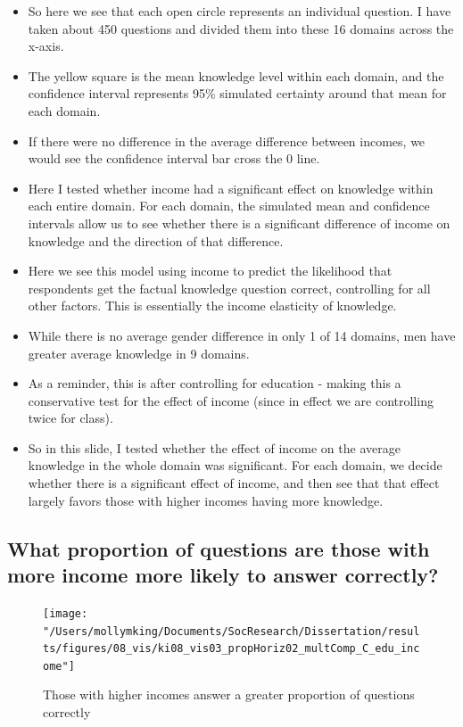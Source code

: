 \documentclass[]{article}
\begin{document}
\begin{itemize}
  \item{So here we see that each open circle represents an individual question. I have taken about 450 questions and divided them into these 16 domains across the x-axis.}
  \item{The yellow square is the mean knowledge level within each domain, and the confidence interval represents 95\% simulated certainty around that mean for each domain.}
  \item{If there were no difference in the average difference between incomes, we would see the confidence interval bar cross the 0 line.}
  \item{Here I tested whether income had a significant effect on knowledge within each entire domain. For each domain, the simulated mean and confidence intervals allow us to see whether there is a significant difference of income on knowledge and the direction of that difference.}
  \item{Here we see this model using income to predict the likelihood that respondents get the factual knowledge question correct, controlling for all other factors. This is essentially the income elasticity of knowledge.}
  \item{While there is no average gender difference in only 1 of 14 domains, men have greater average knowledge in 9 domains.}
  \item{As a reminder, this is after controlling for education - making this a conservative test for the effect of income (since in effect we are controlling twice for class).}
  \item{So in this slide, I tested whether the effect of income on the average knowledge in the whole domain was significant. For each domain, we decide whether there is a significant effect of income, and then see that that effect largely favors those with higher incomes having more knowledge.}
\end{itemize}

\newpage

\subsection{What proportion of questions are those with more income more likely to answer correctly?}

\begin{figure}[ht]
    \begin{center}
      \texttt{[image: "/Users/mollymking/Documents/SocResearch/Dissertation/results/figures/08\_vis/ki08\_vis03\_propHoriz02\_multComp\_C\_edu\_income"]}
      \caption{Those with higher incomes answer a greater proportion of questions correctly}
    \end{center}
\end{figure}
\end{document}

